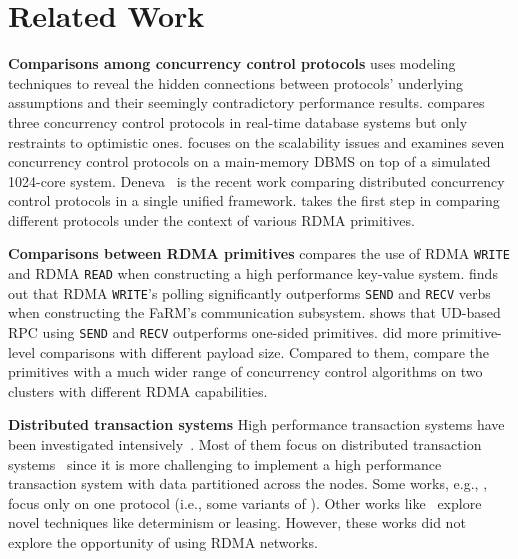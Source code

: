 \section{Related Work}
{\bf Comparisons among concurrency control protocols}
\cite{agrawal1987concurrency} uses modeling techniques to reveal the hidden connections between protocols' underlying assumptions and their seemingly contradictory performance results.\cite{huang1991experimental} compares three concurrency control protocols in real-time database systems but only restraints to optimistic ones. \cite{yu2015evaluation,yu2014staring} focuses on the scalability issues and examines seven concurrency control protocols on a main-memory DBMS on top of a simulated 1024-core system.  Deneva~\cite{harding2017evaluation} is the recent work comparing distributed concurrency control protocols in a single unified framework. 
\projectname 
takes the first step in comparing different protocols under the context of various RDMA primitives.

{\bf Comparisons between RDMA primitives}
\cite{kaminsky2014using} compares the use of RDMA \texttt{WRITE} and RDMA \texttt{READ} when constructing a high performance key-value system. \cite{dragojevic2014farm} finds out that RDMA \texttt{WRITE}'s polling significantly outperforms \texttt{SEND} and \texttt{RECV} verbs when constructing the FaRM's communication subsystem. \cite{kalia2016fasst} shows that UD-based RPC using \texttt{SEND} and \texttt{RECV} outperforms one-sided primitives. \cite{wei2018deconstructing} did more primitive-level comparisons with different payload size. Compared
to them, \projectname compare the primitives
with a much wider range of concurrency control algorithms
on two clusters with different RDMA capabilities.


{\bf Distributed transaction systems}
High performance transaction systems have been investigated intensively~\cite{Thomson:2012:CFD:2213836.2213838,corbett2013spanner,tu2013speedy,dragojevic2015no,chen2016fast,wei2018deconstructing,lee2015implementing}. Most of them focus on distributed transaction systems~\cite{corbett2013spanner,dragojevic2015no,chen2016fast,wei2018deconstructing} since it is more challenging to implement a high performance transaction system with data partitioned across the nodes. 
Some works, e.g., \cite{lee2015implementing,dragojevic2015no,chen2016fast,wei2018deconstructing,kalia2016fasst}, focus only on one protocol (i.e., some variants of \occ). Other works like~\cite{wei2015fast,yu2018sundial,Thomson:2012:CFD:2213836.2213838} explore novel techniques like determinism or leasing. However, these works did not explore the opportunity of using RDMA networks.